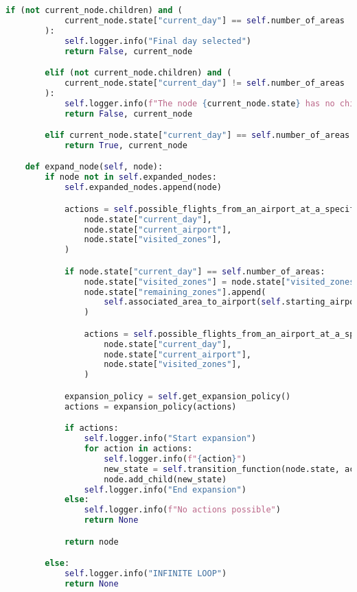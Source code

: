 \begin{lstlisting}[language = Python]
        if (not current_node.children) and (
            current_node.state["current_day"] == self.number_of_areas
        ):
            self.logger.info("Final day selected")
            return False, current_node

        elif (not current_node.children) and (
            current_node.state["current_day"] != self.number_of_areas
        ):
            self.logger.info(f"The node {current_node.state} has no children")
            return False, current_node

        elif current_node.state["current_day"] == self.number_of_areas + 1:
            return True, current_node

    def expand_node(self, node):
        if node not in self.expanded_nodes:
            self.expanded_nodes.append(node)

            actions = self.possible_flights_from_an_airport_at_a_specific_day_with_previous_areas(
                node.state["current_day"],
                node.state["current_airport"],
                node.state["visited_zones"],
            )

            if node.state["current_day"] == self.number_of_areas:
                node.state["visited_zones"] = node.state["visited_zones"][1:]
                node.state["remaining_zones"].append(
                    self.associated_area_to_airport(self.starting_airport)
                )

                actions = self.possible_flights_from_an_airport_at_a_specific_day_with_previous_areas(
                    node.state["current_day"],
                    node.state["current_airport"],
                    node.state["visited_zones"],
                )

            expansion_policy = self.get_expansion_policy()
            actions = expansion_policy(actions)

            if actions:
                self.logger.info("Start expansion")
                for action in actions:
                    self.logger.info(f"{action}")
                    new_state = self.transition_function(node.state, action)
                    node.add_child(new_state)
                self.logger.info("End expansion")
            else:
                self.logger.info(f"No actions possible")
                return None

            return node

        else:
            self.logger.info("INFINITE LOOP")
            return None


\end{lstlisting}
